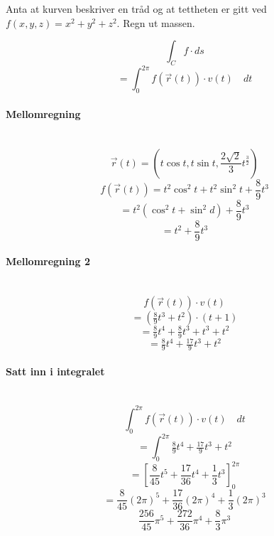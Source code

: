 Anta at kurven beskriver en tråd
og at tettheten er gitt ved
$f(x,y,z) = x^2 + y^2 + z^2$.
Regn ut massen.

$$\int_C f \cdot ds$$
$$= \int_0^{2\pi} f(\vec{r}(t)) \cdot v(t)\quad dt$$

\paragraph{Mellomregning} \mbox{} \\
$$\vec{r}(t) = (t\cos{t},t\sin{t},\frac{2 \sqrt{2}}{3}t^{\frac{3}{2}})$$
$$f(\vec{r}(t)) = t^2\cos^2t + t^2\sin^2t+\frac{8}{9}t^3$$
$$= t^2(\cos^2t + \sin^2d) + \frac{8}{9}t^3$$
$$= t^2 + \frac{8}{9}t^3$$

\paragraph{Mellomregning 2} \mbox{} \\
$$f(\vec{r}(t)) \cdot v(t)$$
$$= (\tfrac{8}{9}t^3 + t^2) \cdot (t+1)$$
$$= \tfrac{8}{9}t^4 + \tfrac{8}{9}t^3 + t^3 + t^2$$
$$= \tfrac{8}{9}t^4 + \tfrac{17}{9}t^3 + t^2$$

\paragraph{Satt inn i integralet} \mbox{} \\
$$\int_0^{2\pi} f(\vec{r}(t)) \cdot v(t)\quad dt$$
$$= \int_0^{2\pi} \tfrac{8}{9}t^4 + \tfrac{17}{9}t^3 + t^2$$
$$= \left[\frac{8}{45}t^5 + \frac{17}{36}t^4
     + \frac{1}{3}t^3\right]_0^{2\pi}$$
$$= \frac{8}{45}(2\pi)^5 + \frac{17}{36}(2\pi)^4 + \frac{1}{3}(2\pi)^3$$
$$\frac{256}{45}\pi^5 + \frac{272}{36}\pi^4 + \frac{8}{3}\pi^3$$
